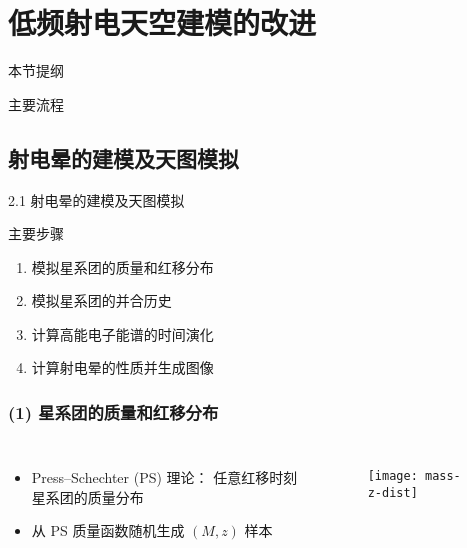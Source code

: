 \documentclass{beamer}
\begin{document}
\section{低频射电天空建模的改进}

\begin{frame}
  \begin{block}{本节提纲}
    \vspace{2ex}
    \tableofcontents[
      sections=\value{section},
      sectionstyle=hide,
    ]
  \end{block}
\end{frame}

\begin{frame}
  \begin{block}{主要流程}
    \vspace{-1ex}
    \begin{figure}
    \end{figure}
  \end{block}
\end{frame}

\subsection{射电晕的建模及天图模拟}

\begin{frame}{2.1 射电晕的建模及天图模拟}
  \begin{alertblock}{主要步骤}
    \begin{enumerate}
      \item 模拟星系团的质量和红移分布
      \item 模拟星系团的并合历史
      \item 计算高能电子能谱的时间演化
      \item 计算射电晕的性质并生成图像
    \end{enumerate}
  \end{alertblock}
\end{frame}

\begin{frame}[subsec]
  \frametitle{(1) 星系团的质量和红移分布}
  \begin{columns}[t,onlytextwidth]
    \begin{itemize}
      \item Press--Schechter (PS) 理论：
        任意红移时刻星系团的质量分布
      \item 从 PS 质量函数随机生成 $(M, z)$ 样本
    \end{itemize}

    \begin{figure}
      \centering
      \texttt{[image: mass-z-dist]}
    \end{figure}
  \end{columns}
\end{frame}
\end{document}
